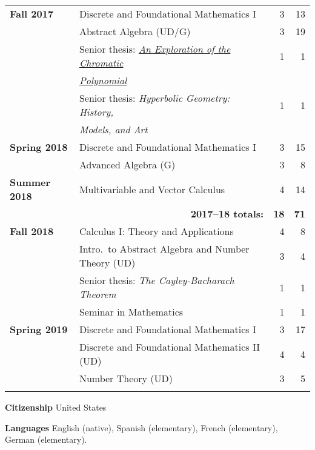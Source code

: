 \documentclass[12pt]{article}
\begin{document}
\begin{center}
\begin{longtable}{@{} l @{\hspace{1ex}} l @{} rr @{}}
\textbf{Fall 2017} & Discrete and Foundational Mathematics I & 3 & 13 \\
 & Abstract Algebra (UD/G) & 3 & 19 \\
 & Senior thesis: \href{https://scholarworks.boisestate.edu/math_undergraduate_theses/7/}{\emph{An Exploration of the Chromatic}} & 1 & 1 \\
 & \qquad \href{https://scholarworks.boisestate.edu/math_undergraduate_theses/7/}{\emph{Polynomial}} & & \\
 & Senior thesis: \emph{Hyperbolic Geometry: History,} & 1 & 1 \\
 & \qquad \emph{Models, and Art} & & \\
\addlinespace[0.1in]

\textbf{Spring 2018} & Discrete and Foundational Mathematics I & 3 & 15 \\
 & Advanced Algebra (G) & 3 & 8 \\
\addlinespace[0.1in]

\textbf{Summer 2018} & Multivariable and Vector Calculus & 4 & 14 \\

 \cmidrule{2-4}
 & \multicolumn{1}{r}{\textbf{2017--18 totals:}} & \textbf{18} & \textbf{71} \\
 \cmidrule{2-4}

\textbf{Fall 2018} & Calculus I: Theory and Applications & 4 & 8 \\
 & Intro.\ to Abstract Algebra and Number Theory (UD) & 3 & 4 \\
 & Senior thesis: \emph{The Cayley-Bacharach Theorem} & 1 & 1 \\
 & Seminar in Mathematics & 1 & 1 \\
\addlinespace[0.1in]

\textbf{Spring 2019} & Discrete and Foundational Mathematics I & 3 & 17 \\
 & Discrete and Foundational Mathematics II (UD) & 4 & 4 \\
 & Number Theory (UD) & 3 & 5 \\
\addlinespace[0.1in]

\bottomrule


\end{longtable}
\end{center}





\textbf{Citizenship}
\quad United States
\bigskip


\textbf{Languages}
\quad English (native), Spanish (elementary), French (elementary), German (elementary).
\bigskip
\end{document}
